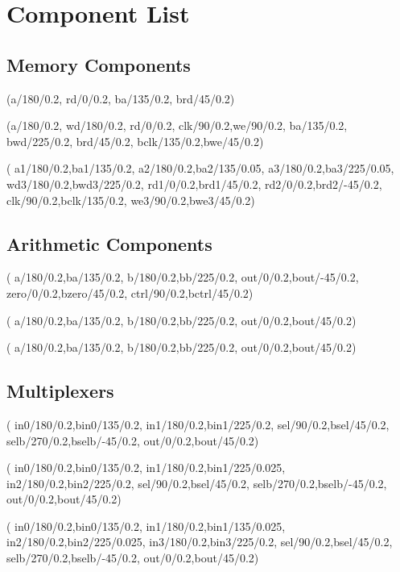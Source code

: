 \documentclass[10pt,a4paper]{scrartcl}
\begin{document}
\newpage
\section{Component List}
\subsection{Memory Components}
(a/180/0.2, rd/0/0.2, ba/135/0.2, brd/45/0.2)

(a/180/0.2, wd/180/0.2, rd/0/0.2, clk/90/0.2,we/90/0.2, ba/135/0.2, bwd/225/0.2, brd/45/0.2, bclk/135/0.2,bwe/45/0.2)

(
a1/180/0.2,ba1/135/0.2,
a2/180/0.2,ba2/135/0.05,
a3/180/0.2,ba3/225/0.05,
wd3/180/0.2,bwd3/225/0.2,
rd1/0/0.2,brd1/45/0.2,
rd2/0/0.2,brd2/-45/0.2,
clk/90/0.2,bclk/135/0.2,
we3/90/0.2,bwe3/45/0.2)

\subsection{Arithmetic Components}
(
a/180/0.2,ba/135/0.2,
b/180/0.2,bb/225/0.2,
out/0/0.2,bout/-45/0.2,
zero/0/0.2,bzero/45/0.2,
ctrl/90/0.2,bctrl/45/0.2)


(
a/180/0.2,ba/135/0.2,
b/180/0.2,bb/225/0.2,
out/0/0.2,bout/45/0.2)


(
a/180/0.2,ba/135/0.2,
b/180/0.2,bb/225/0.2,
out/0/0.2,bout/45/0.2)

\subsection{Multiplexers}
(
in0/180/0.2,bin0/135/0.2,
in1/180/0.2,bin1/225/0.2,
sel/90/0.2,bsel/45/0.2,
selb/270/0.2,bselb/-45/0.2,
out/0/0.2,bout/45/0.2)

(
in0/180/0.2,bin0/135/0.2,
in1/180/0.2,bin1/225/0.025,
in2/180/0.2,bin2/225/0.2,
sel/90/0.2,bsel/45/0.2,
selb/270/0.2,bselb/-45/0.2,
out/0/0.2,bout/45/0.2)

(
in0/180/0.2,bin0/135/0.2,
in1/180/0.2,bin1/135/0.025,
in2/180/0.2,bin2/225/0.025,
in3/180/0.2,bin3/225/0.2,
sel/90/0.2,bsel/45/0.2,
selb/270/0.2,bselb/-45/0.2,
out/0/0.2,bout/45/0.2)
\end{document}
